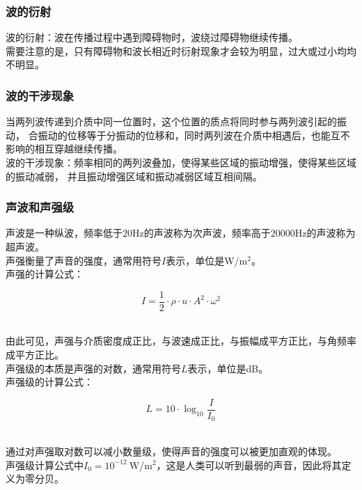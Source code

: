 \documentclass[UTF8]{ctexart}
\begin{document}
\subsubsection{波的衍射}
    波的衍射：波在传播过程中遇到障碍物时，波绕过障碍物继续传播。\\[3mm]
    需要注意的是，只有障碍物和波长相近时衍射现象才会较为明显，过大或过小均均不明显。

\newpage

\subsubsection{波的干涉现象}
    当两列波传递到介质中同一位置时，这个位置的质点将同时参与两列波引起的振动，
    合振动的位移等于分振动的位移和，同时两列波在介质中相遇后，也能互不影响的相互穿越继续传播。\\[3mm]
    波的干涉现象：频率相同的两列波叠加，使得某些区域的振动增强，使得某些区域的振动减弱，
    并且振动增强区域和振动减弱区域互相间隔。

\subsubsection{声波和声强级}
    声波是一种纵波，频率低于$20$Hz的声波称为次声波，频率高于$20000$Hz的声波称为超声波。\\[3mm]
    声强衡量了声音的强度，通常用符号$I$表示，单位是W/m$^2$。\\[3mm]
    声强的计算公式：
    \begin{large}
        \begin{equation*}
            I=\frac{1}{2}\cdot\rho\cdot u\cdot A^2\cdot\omega^2
        \end{equation*}
    \end{large}\\
    由此可见，声强与介质密度成正比，与波速成正比，与振幅成平方正比，与角频率成平方正比。\\[5mm]
    声强级的本质是声强的对数，通常用符号$L$表示，单位是dB。\\[3mm]
    声强级的计算公式：
    \begin{large}
        \begin{equation*}
            L=10\cdot\log_{10}{\frac{I}{I_0}}
        \end{equation*}
    \end{large}\\
    通过对声强取对数可以减小数量级，使得声音的强度可以被更加直观的体现。\\[3mm]
    声强级计算公式中$I_0=10^{-12}~$W/m$^2$，这是人类可以听到最弱的声音，因此将其定义为零分贝。
\end{document}
